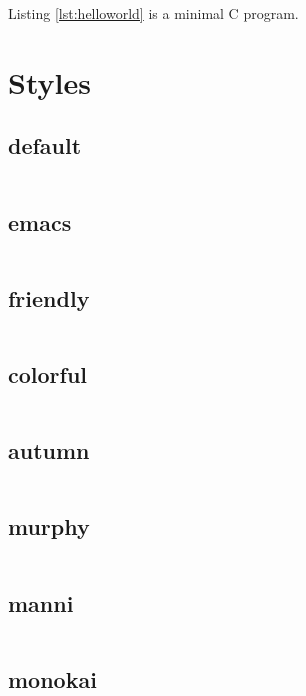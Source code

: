 \documentclass{article}
\begin{document}
Listing \ref{lst:helloworld} is a minimal C program.

\section{Styles}

\subsection{default}
\inputminted[bgcolor=AntiqueWhite]{c}{../code/helloworld.c}

\subsection{emacs}
\inputminted[bgcolor=AntiqueWhite]{c}{../code/helloworld.c}

\subsection{friendly}
\inputminted[bgcolor=AntiqueWhite]{c}{../code/helloworld.c}

\subsection{colorful}
\inputminted[bgcolor=AntiqueWhite]{c}{../code/helloworld.c}

\subsection{autumn}
\inputminted[bgcolor=AntiqueWhite]{c}{../code/helloworld.c}

\subsection{murphy}
\inputminted[bgcolor=AntiqueWhite]{c}{../code/helloworld.c}

\subsection{manni}
\inputminted[bgcolor=AntiqueWhite]{c}{../code/helloworld.c}

\subsection{monokai}
\inputminted[bgcolor=AntiqueWhite]{c}{../code/helloworld.c}
\end{document}
